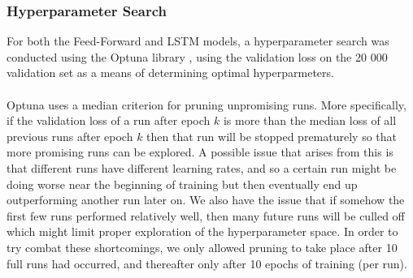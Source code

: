 \documentclass{article}
\theoremstyle{definition}
\begin{document}
\subsubsection{Hyperparameter Search}
For both the Feed-Forward and LSTM models, a hyperparameter search was conducted using the Optuna library \cite{optuna_2019}, using the validation loss on the 20 000 validation set as a means of determining optimal hyperparmeters. \\\\
Optuna uses a median criterion for pruning unpromising runs. More specifically, if the validation loss of a run after epoch $k$ is more than the median loss of all previous runs after epoch $k$ then that run will be stopped prematurely so that more promising runs can be explored. A possible issue that arises from this is that different runs have different learning rates, and so a certain run might be doing worse near the beginning of training but then eventually end up outperforming another run later on. We also have the issue that if somehow the first few runs performed relatively well, then many future runs will be culled off which might limit proper exploration of the hyperparameter space. In order to try combat these shortcomings, we only allowed pruning to take place after 10 full runs had occurred, and thereafter only after 10 epochs of training (per run).\\\\
\end{document}

